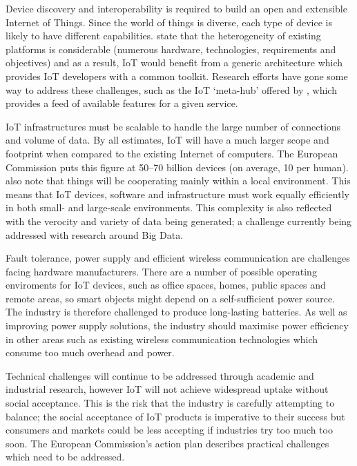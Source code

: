     Device discovery and interoperability is required to build an open and extensible Internet of Things. Since the world of things is diverse, each type of device is likely to have different capabilities. \citet{interoperability:2015} state that the heterogeneity of existing platforms is considerable (numerous hardware, technologies, requirements and objectives) and as a result, IoT would benefit from a generic architecture which provides IoT developers with a common toolkit. Research efforts have gone some way to address these challenges, such as the IoT `meta-hub' offered by \citeauthor{interoperability:2015}, which provides a feed of available features for a given service.

    IoT infrastructures must be scalable to handle the large number of connections and volume of data. By all estimates, IoT will have a much larger scope and footprint when compared to the existing Internet of computers. The European Commission puts this figure at 50--70 billion devices (on average, 10 per human). \citet{fromIoC} also note that things will be cooperating mainly within a local environment. This means that IoT devices, software and infrastructure must work equally efficiently in both small- and large-scale environments. This complexity is also reflected with the verocity and variety of data being generated; a challenge currently being addressed with research around Big Data.

    Fault tolerance, power supply and efficient wireless communication are challenges facing hardware manufacturers. There are a number of possible operating enviroments for IoT devices, such as office spaces, homes, public spaces and remote areas, so smart objects might depend on a self-sufficient power source. The industry is therefore challenged to produce long-lasting batteries. As well as improving power supply solutions, the industry should maximise power efficiency in other areas such as existing wireless communication technologies which consume too much overhead and power. 

    Technical challenges will continue to be addressed through academic and industrial research, however IoT will not achieve widespread uptake without social acceptance. This is the risk that the industry is carefully attempting to balance; the social acceptance of IoT products is imperative to their success but consumers and markets could be less accepting if industries try too much too soon. The European Commission's action plan describes practical challenges which need to be addressed.

